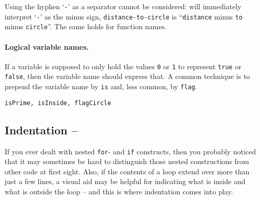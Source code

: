 \begin{remark}
Using the hyphen `\lstinline!-!' as a separator cannot be considered: \matlab{} will immediately interpret `\lstinline!-!' as the minus sign, \lstinline!distance-to-circle! is ``\lstinline!distance! minus \lstinline!to! minus \lstinline!circle!''. The same holds for function names.
\end{remark}


\paragraph{Logical variable names.} If a variable is supposed to only hold the values \lstinline!0! or \lstinline!1! to represent \lstinline!true! or \lstinline!false!, then the variable name should express that. A common technique is to prepend the variable name by \lstinline!is! and, less common, by \lstinline!flag!.
\begin{lstlisting}
isPrime, isInside, flagCircle
\end{lstlisting}


\subsection{Indentation -- \cleansymbol\cleansymbol\cleansymbol\cleansymbol}

If you ever dealt with nested \lstinline!for!- and \lstinline!if! constructs, then you probably noticed that it may sometimes be hard to distinguish those nested constructions from other code at first sight. Also, if the contents of a loop extend over more than just a few lines, a visual aid may be helpful for indicating what is inside and what is outside the loop -- and this is where indentation comes into play.

